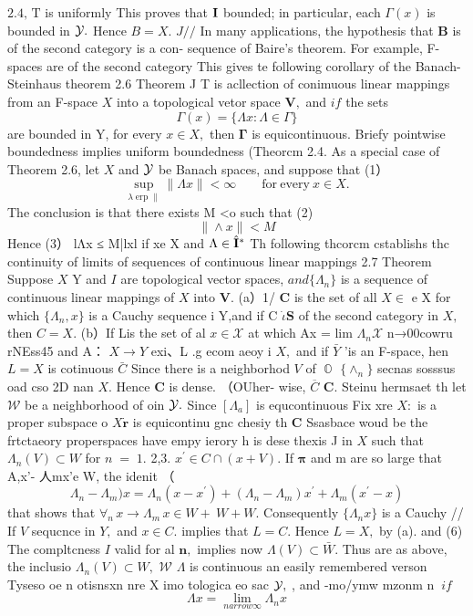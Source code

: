 $2.4,\,\mathrm{T}$ is uniformly This proves that ${\bf I}$ bounded; in particular, each $\Gamma(x)$ is bounded in ${\cal{Y}}.$ Hence $B=X.$ $J/{\big/}$ In many applications, the hypothesis that $\boldsymbol{B}$ is of the second category is a con- sequence of Baire's theorem. For example, F-spaces are of the second category This gives te following corollary of the Banach-Steinhaus theorem 2.6 Theorem J T is acllection of conimuous linear mappings from an F-space $\textstyle{X}$ into a topological vetor space ${\boldsymbol{V}},$ and $i f$ the sets $$ \Gamma(x)=\{\Lambda x\colon\Lambda\in\Gamma\} $$ are bounded in Y, for every $x\in X,$ then ${\boldsymbol{\Gamma}}$ is equicontinuous. Briefy pointwise boundedness implies uniform boundedness (Theorcm 2.4. As a special case of Theorem 2.6, let $X$ and ${\cal{Y}}$ be Banach spaces, and suppose that (1） $$ \operatorname*{sup}_{\lambda\operatorname{erp}\parallel}\|\Lambda x\|<\infty\qquad{\mathrm{for~every~}}x\in X. $$ The conclusion is that there exists M <o such that (2) $$ \|\land x\|<M $$ Hence (3） lΛx ≤ M|lxl if xe X and $\Lambda\in{\hat{\bf I}}^{*}$ Th following thcorcm cstablishs thc continuity of limits of sequences of continuous linear mappings 2.7 Theorem Suppose $X$ Y and $\boldsymbol{\mathit{I}}$ are topological vector spaces, $a n d\{\Lambda_{n}\}$ is a sequence of continuous linear mappings of $\textstyle X$ into ${\boldsymbol{V}}.$ (a）1/ ${\boldsymbol{C}}$ is the set of all $X\in$ e X for which $\{\Lambda_{n},x\}$ is a Cauchy sequence i Y,and if C $\dot{\iota}{\boldsymbol{S}}$ of the second category in $X,$ then $C=X.$ (b）If Lis the set of al $x\in{\mathcal{X}}$ at which Ax = lim $\Lambda_{n}{\mathcal{X}}$ n→00cowru rNEss45 and A： $X\to Y$ exi、L .g ecom aeoy i $X,$ and if $\bar{Y}$ 'is an F-space, hen $L=X$ is cotinuous $\bar{C}$ Since there is a neighborhod ${\mathbf{}}V$ of $\operatorname{\mathbb{O}}$ $\{\land_{n}\}$ secnas sosssus oad cso 2D nan $X.$ Hence ${\boldsymbol{C}}$ is dense. （OUher- wise, $\overline{{C}}$ ${\boldsymbol{C}}.$ Steinu hermsaet th let ${\mathcal{W}}$ be a neighborhood of oin ${\cal{Y}}.$ Since $[\Lambda_{a}]$ is equcontinuous Fix xre $X{\mathrm{:}}$ is a proper subspace o $X{\dot{\boldsymbol{r}}}$ is equicontinu gnc chesiy th ${\boldsymbol{C}}$ Ssasbace woud be the frtctaeory properspaces have empy ierory h is dese thexis J in $\textstyle X$ such that $\Lambda_{n}(V)\subset W$ for $\scriptstyle n\;=\;1.$ 2,3. $x^{\prime}\in C\cap(x+V).$ If ${\boldsymbol{\pi}}$ and m are so large that A,x'- 人mx'e W, the idenit （ $$ \Lambda_{n}-\Lambda_{m})x=\Lambda_{n}(x-x^{\prime})+(\Lambda_{n}-\Lambda_{m})x^{\prime}+\Lambda_{m}(x^{\prime}-x) $$ that shows that $\forall_{n}\,x\to\Lambda_{m}\,x\in W+\ W+W.$ Consequently $\{\Lambda_{n}x\}$ is a Cauchy // If ${\mathbf{}}V$ sequcnce in $\textstyle Y,$ and $x\in C.$ implies that $L=C.$ Hence $L=X,$ by (a). and (6) The compltcness $\boldsymbol{\mathit{I}}$ valid for al ${\boldsymbol{n}},$ implies now $\Lambda(V)\subset\bar{W}.$ Thus are as above, the inclusio $\Lambda_{n}(V)\subset W,$ ${\mathcal{W}}$ $\Lambda$ is continuous an easily remembered verson Tyseso oe n otisnsxn nre X imo tologica eo sac ${\cal Y},$ , and -mo/ymw mzonm n $~i f$ $$ \Lambda x=\operatorname*{lim}_{n arrow\infty}\Lambda_{n}x $$ 